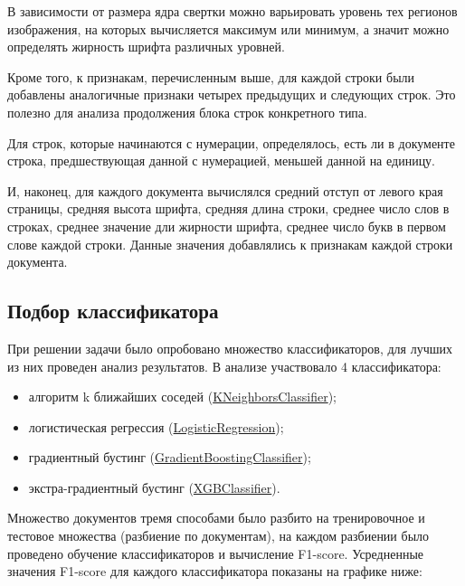 \documentclass[a4paper,12pt]{article}
\begin{document}
В зависимости от размера ядра свертки можно варьировать уровень тех регионов изображения, на которых вычисляется максимум или минимум, а значит можно определять жирность шрифта различных уровней.

Кроме того, к признакам, перечисленным выше, для каждой строки были добавлены аналогичные признаки четырех предыдущих и следующих строк. Это полезно для анализа продолжения блока строк конкретного типа.

Для строк, которые начинаются с нумерации, определялось, есть ли в документе строка, предшествующая данной с нумерацией, меньшей данной на единицу.

И, наконец, для каждого документа вычислялся средний отступ от левого края страницы, средняя высота шрифта, средняя длина строки, среднее число слов в строках, среднее значение дли жирности шрифта, среднее число букв в первом слове каждой строки. Данные значения добавлялись к признакам каждой строки документа.

\subsection{Подбор классификатора}

При решении задачи было опробовано множество классификаторов, для лучших из них проведен анализ результатов. В анализе участвовало 4 классификатора:

\begin{itemize}

	\item алгоритм k ближайших соседей (\href{https://scikit-learn.org/stable/modules/generated/sklearn.neighbors.KNeighborsClassifier.html}{KNeighborsClassifier});
	\item логистическая регрессия (\href{https://scikit-learn.org/stable/modules/generated/sklearn.linear_model.LogisticRegression.html}{LogisticRegression});
	\item градиентный бустинг (\href{https://scikit-learn.org/stable/modules/generated/sklearn.ensemble.GradientBoostingClassifier.html}{GradientBoostingClassifier});
	\item экстра-градиентный бустинг (\href{https://xgboost.readthedocs.io/en/latest/}{XGBClassifier}).

\end{itemize}

Множество документов тремя способами было разбито на тренировочное и тестовое множества (разбиение по документам), на каждом разбиении было проведено обучение классификаторов и вычисление F1-score. Усредненные значения F1-score для каждого классификатора показаны на графике ниже:
\end{document}
